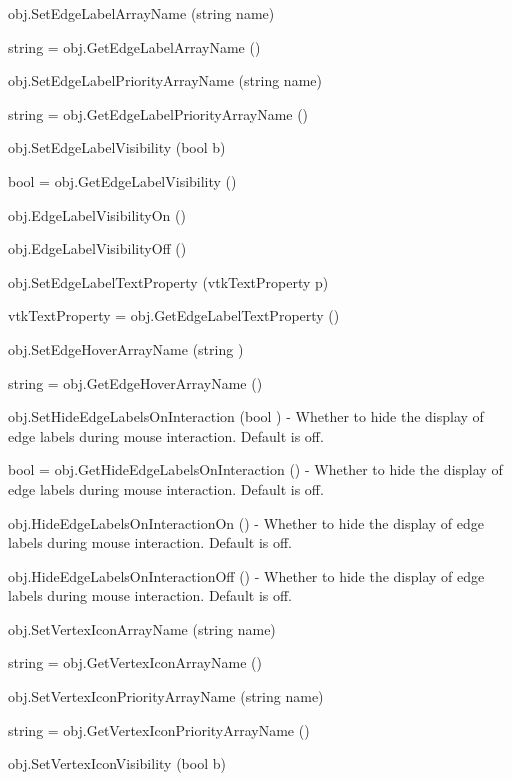 \begin{DoxyItemize}
\item {\ttfamily obj.\-Set\-Edge\-Label\-Array\-Name (string name)}  
\item {\ttfamily string = obj.\-Get\-Edge\-Label\-Array\-Name ()}  
\item {\ttfamily obj.\-Set\-Edge\-Label\-Priority\-Array\-Name (string name)}  
\item {\ttfamily string = obj.\-Get\-Edge\-Label\-Priority\-Array\-Name ()}  
\item {\ttfamily obj.\-Set\-Edge\-Label\-Visibility (bool b)}  
\item {\ttfamily bool = obj.\-Get\-Edge\-Label\-Visibility ()}  
\item {\ttfamily obj.\-Edge\-Label\-Visibility\-On ()}  
\item {\ttfamily obj.\-Edge\-Label\-Visibility\-Off ()}  
\item {\ttfamily obj.\-Set\-Edge\-Label\-Text\-Property (vtk\-Text\-Property p)}  
\item {\ttfamily vtk\-Text\-Property = obj.\-Get\-Edge\-Label\-Text\-Property ()}  
\item {\ttfamily obj.\-Set\-Edge\-Hover\-Array\-Name (string )}  
\item {\ttfamily string = obj.\-Get\-Edge\-Hover\-Array\-Name ()}  
\item {\ttfamily obj.\-Set\-Hide\-Edge\-Labels\-On\-Interaction (bool )} -\/ Whether to hide the display of edge labels during mouse interaction. Default is off.  
\item {\ttfamily bool = obj.\-Get\-Hide\-Edge\-Labels\-On\-Interaction ()} -\/ Whether to hide the display of edge labels during mouse interaction. Default is off.  
\item {\ttfamily obj.\-Hide\-Edge\-Labels\-On\-Interaction\-On ()} -\/ Whether to hide the display of edge labels during mouse interaction. Default is off.  
\item {\ttfamily obj.\-Hide\-Edge\-Labels\-On\-Interaction\-Off ()} -\/ Whether to hide the display of edge labels during mouse interaction. Default is off.  
\item {\ttfamily obj.\-Set\-Vertex\-Icon\-Array\-Name (string name)}  
\item {\ttfamily string = obj.\-Get\-Vertex\-Icon\-Array\-Name ()}  
\item {\ttfamily obj.\-Set\-Vertex\-Icon\-Priority\-Array\-Name (string name)}  
\item {\ttfamily string = obj.\-Get\-Vertex\-Icon\-Priority\-Array\-Name ()}  
\item {\ttfamily obj.\-Set\-Vertex\-Icon\-Visibility (bool b)}  

\end{DoxyItemize}
